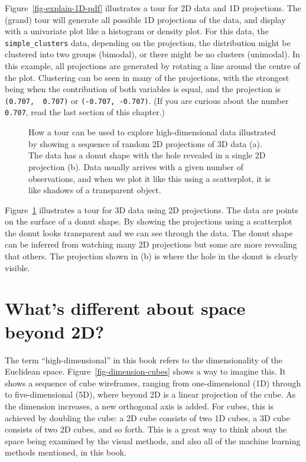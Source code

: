 \documentclass[
  letterpaper,
]{krantz}
\begin{document}
Figure~\ref{fig-explain-1D-pdf} illustrates a tour for 2D data and 1D
projections. The (grand) tour will generate all possible 1D projections
of the data, and display with a univariate plot like a histogram or
density plot. For this data, the \texttt{simple\_clusters} data,
depending on the projection, the distribution might be clustered into
two groups (bimodal), or there might be no clusters (unimodal). In this
example, all projections are generated by rotating a line around the
centre of the plot. Clustering can be seen in many of the projections,
with the strongest being when the contribution of both variables is
equal, and the projection is \texttt{(0.707,\ \ 0.707)} or
\texttt{(-0.707,\ -0.707)}. (If you are curious about the number
\texttt{0.707}, read the last section of this chapter.)


\begin{figure}


\caption{\label{fig-explain-2D-pdf}How a tour can be used to explore
high-dimensional data illustrated by showing a sequence of random 2D
projections of 3D data (a). The data has a donut shape with the hole
revealed in a single 2D projection (b). Data usually arrives with a
given number of observations, and when we plot it like this using a
scatterplot, it is like shadows of a transparent object.
}

\end{figure}%

Figure~\ref{fig-explain-2D-pdf} illustrates a tour for 3D data using 2D
projections. The data are points on the surface of a donut shape. By
showing the projections using a scatterplot the donut looks transparent
and we can see through the data. The donut shape can be inferred from
watching many 2D projections but some are more revealing that others.
The projection shown in (b) is where the hole in the donut is clearly
visible. 

\section{What's different about space beyond
2D?}\label{whats-different-about-space-beyond-2d}

The term ``high-dimensional'' in this book refers to the dimensionality
of the Euclidean space. Figure~\ref{fig-dimension-cubes} shows a way to
imagine this. It shows a sequence of cube wireframes, ranging from
one-dimensional (1D) through to five-dimensional (5D), where beyond 2D
is a linear projection of the cube. As the dimension increases, a new
orthogonal axis is added. For cubes, this is achieved by doubling the
cube: a 2D cube consists of two 1D cubes, a 3D cube consists of two 2D
cubes, and so forth. This is a great way to think about the space being
examined by the visual methods, and also all of the machine learning
methods mentioned, in this book.
\end{document}
